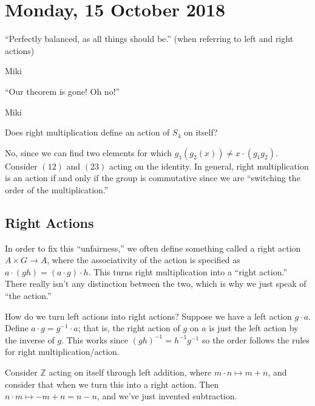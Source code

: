 \section{Monday, 15 October 2018}

\epigraph{``Perfectly balanced, as all things should be.'' (when referring to left and right actions)}{Miki}
\epigraph{``Our theorem is gone! Oh no!''}{Miki}

\begin{problem}
Does right multiplication define an action of $S_4$ on itself?
\end{problem}
\begin{solution}
No, since we can find two elements for which $g_1(g_2(x)) \not= x \cdot (g_1g_2)$. Consider $(12)$ and $(23)$ acting on the identity. In general, right multiplication is an action if and only if the group is commutative since we are ``switching the order of the multiplication.''
\end{solution}

\subsection{Right Actions}
In order to fix this ``unfairness,'' we often define something called a right action $A \times G \to A$, where the associativity of the action is specified as $a \cdot (gh) = (a \cdot g) \cdot h$. This turns right multiplication into a ``right action.'' There really isn't any distinction between the two, which is why we just speak of ``the action.''

How do we turn left actions into right actions? Suppose we have a left action $g \cdot a$. Define $a \cdot g = g^{-1} \cdot a$; that is, the right action of $g$ on $a$ is just the left action by the inverse of $g$. This works since $(gh)^{-1} = h^{-1}g^{-1}$ so the order follows the rules for right multiplication/action.

\begin{problem}
Consider $\mathbb{Z}$ acting on itself through left addition, where $m \cdot n \mapsto m + n$, and consider that when we turn this into a right action. Then $n \cdot m \mapsto -m + n = n - n$, and we've just invented subtraction.
\end{problem}

